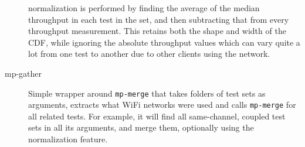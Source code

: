 \begin{description}
    normalization is performed by finding the average of the median throughput
    in each test in the set, and then subtracting that from every throughput
    measurement. This retains both the shape and width of the CDF, while
    ignoring the absolute throughput values which can vary quite a lot from one
    test to another due to other clients using the network.
  \item[mp-gather]
    Simple wrapper around \texttt{mp-merge} that takes folders of test sets as
    arguments, extracts what WiFi networks were used and calls \texttt{mp-merge}
    for all related tests. For example, it will find all same-channel, coupled
    test sets in all its arguments, and merge them, optionally using the
    normalization feature.
\end{description}
